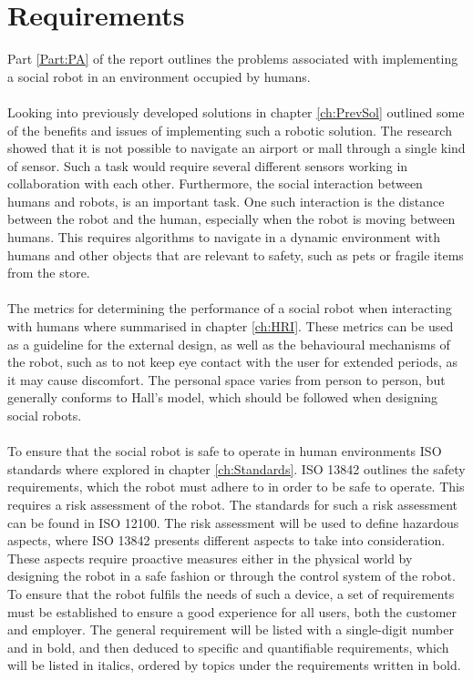 \chapter{Requirements}\label{ch:reqandlim}
Part \ref{Part:PA} of the report outlines the problems associated with implementing a social robot in an environment occupied by humans.\\
\\%
Looking into previously developed solutions in chapter \ref{ch:PrevSol} outlined some of the benefits and issues of implementing such a robotic solution. The research showed that it is not possible to navigate an airport or mall through a single kind of sensor. Such a task would require several different sensors working in collaboration with each other. Furthermore, the social interaction between humans and robots, is an important task. One such interaction is the distance between the robot and the human, especially when the robot is moving between humans. This requires algorithms to navigate in a dynamic environment with humans and other objects that are relevant to safety, such as pets or fragile items from the store.\\
\\%
The metrics for determining the performance of a social robot when interacting with humans where summarised in chapter \ref{ch:HRI}.
These metrics can be used as a guideline for the external design, as well as the behavioural mechanisms of the robot, such as to not keep eye contact with the user for extended periods, as it may cause discomfort. The personal space varies from person to person, but generally conforms to Hall's model, which should be followed when designing social robots.\\
\\%
To ensure that the social robot is safe to operate in human environments ISO standards where explored in chapter \ref{ch:Standards}.
ISO 13842 outlines the safety requirements, which the robot must adhere to in order to be safe to operate. This requires a risk assessment of the robot. The standards for such a risk assessment can be found in ISO 12100. The risk assessment will be used to define hazardous aspects, where ISO 13842 presents different aspects to take into consideration. These aspects require proactive measures either in the physical world by designing the robot in a safe fashion or through the control system of the robot.\\

To ensure that the robot fulfils the needs of such a device, a set of requirements must be established to ensure a good experience for all users, both the customer and employer. The general requirement will be listed with a single-digit number and in bold, and then deduced to specific and quantifiable requirements, which will be listed in italics, ordered by topics under the  requirements written in bold.

